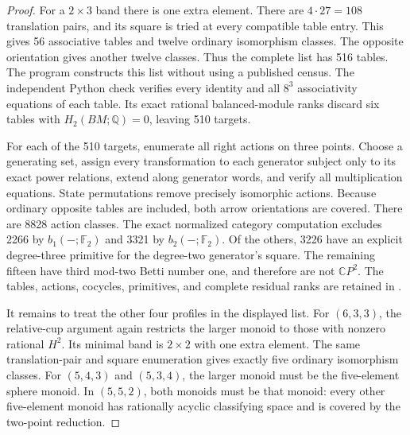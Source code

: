\begin{proof}
For a $2\times3$ band there is one extra element. There are
$4\cdot27=108$ translation pairs, and its square is tried at
every compatible table entry. This gives 56 associative tables
and twelve ordinary isomorphism classes. The opposite orientation
gives another twelve classes. Thus the complete list has 516
tables. The program  constructs
this list without using a published census. The independent Python
check verifies every identity and all $8^3$ associativity equations
of each table. Its exact rational balanced-module ranks discard
six tables with $H_2(BM;\mathbb Q)=0$, leaving 510 targets.

For each of the 510 targets, enumerate all right actions on three
points. Choose a generating set, assign every transformation to
each generator subject only to its exact power relations, extend
along generator words, and verify all multiplication equations.
State permutations remove precisely isomorphic actions. Because
ordinary opposite tables are included, both arrow orientations
are covered. There are 8828 action classes. The exact normalized
category computation excludes 2266 by $b_1(-;\mathbb F_2)$ and
3321 by $b_2(-;\mathbb F_2)$. Of the others, 3226 have an explicit
degree-three primitive for the degree-two generator's square.
The remaining fifteen have third mod-two Betti number one, and
therefore are not $\mathbb CP^2$. The tables, actions, cocycles,
primitives, and complete residual ranks are retained in
.

It remains to treat the other four profiles in the displayed list.
For $(6,3,3)$, the relative-cup argument again restricts the larger
monoid to those with nonzero rational $H^2$. Its minimal band is
$2\times2$ with one extra element. The same translation-pair and
square enumeration gives exactly five ordinary isomorphism classes.
For $(5,4,3)$ and $(5,3,4)$, the larger monoid must be the
five-element sphere monoid. In $(5,5,2)$, both monoids must be that
monoid: every other five-element monoid has rationally acyclic
classifying space and is covered by the two-point reduction.


\end{proof}
